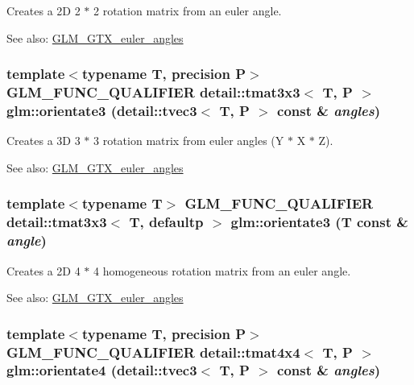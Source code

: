 Creates a 2D 2 $\ast$ 2 rotation matrix from an euler angle. \begin{Desc}
\item[See also:]\hyperlink{group__gtx__euler__angles}{GLM\_\-GTX\_\-euler\_\-angles} \end{Desc}
\hypertarget{group__gtx__euler__angles_g114ce533cc2f140cb17ca5a44214d973}{
\subsubsection[orientate3]{\setlength{\rightskip}{0pt plus 5cm}template$<$typename T, precision P$>$ GLM\_\-FUNC\_\-QUALIFIER detail::tmat3x3$<$ T, P $>$ glm::orientate3 (detail::tvec3$<$ T, P $>$ const \& {\em angles})}}
\label{group__gtx__euler__angles_g114ce533cc2f140cb17ca5a44214d973}


Creates a 3D 3 $\ast$ 3 rotation matrix from euler angles (Y $\ast$ X $\ast$ Z). \begin{Desc}
\item[See also:]\hyperlink{group__gtx__euler__angles}{GLM\_\-GTX\_\-euler\_\-angles} \end{Desc}
\hypertarget{group__gtx__euler__angles_gce794db535af3056d97f4f62e7ed7509}{
\subsubsection[orientate3]{\setlength{\rightskip}{0pt plus 5cm}template$<$typename T$>$ GLM\_\-FUNC\_\-QUALIFIER detail::tmat3x3$<$ T, defaultp $>$ glm::orientate3 (T const \& {\em angle})}}
\label{group__gtx__euler__angles_gce794db535af3056d97f4f62e7ed7509}


Creates a 2D 4 $\ast$ 4 homogeneous rotation matrix from an euler angle. \begin{Desc}
\item[See also:]\hyperlink{group__gtx__euler__angles}{GLM\_\-GTX\_\-euler\_\-angles} \end{Desc}
\hypertarget{group__gtx__euler__angles_g98f6c8d3b6b97ff0ae2f64544142cb7f}{
\subsubsection[orientate4]{\setlength{\rightskip}{0pt plus 5cm}template$<$typename T, precision P$>$ GLM\_\-FUNC\_\-QUALIFIER detail::tmat4x4$<$ T, P $>$ glm::orientate4 (detail::tvec3$<$ T, P $>$ const \& {\em angles})}}
\label{group__gtx__euler__angles_g98f6c8d3b6b97ff0ae2f64544142cb7f}


